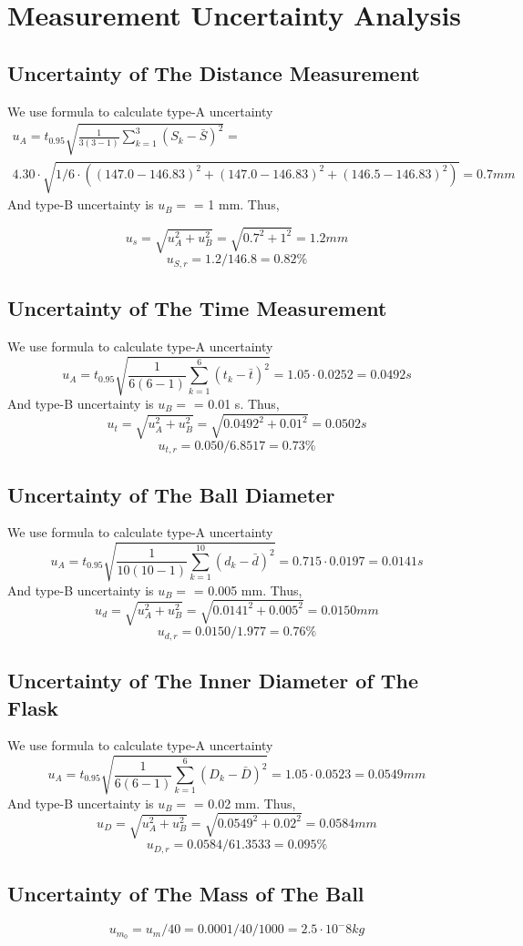 \section{Measurement Uncertainty Analysis}

\subsection{Uncertainty of The Distance Measurement}
We use formula to calculate type-A uncertainty
\begin{multline*}
 u_A = t_{0.95} \sqrt{\frac{1}{3(3-1)} \sum_{k=1}^3{(S_k-\bar{S})^2} } = \\
4.30 \cdot \sqrt{1/6\cdot ( (147.0-  146.83)^2 +  (147.0-  146.83)^2 + (146.5-
  146.83)^2 ) } =   0.7 mm
\end{multline*}
And type-B uncertainty is $u_B = $ = 1 mm. Thus,

$$   u_s = \sqrt{u_A^2+u_B^2} = \sqrt{0.7^2+1^2} = 1.2 mm  $$
$$   u_{S,r} = 1.2 / 146.8 = 0.82 \% $$ 

\subsection{Uncertainty of The Time Measurement}
We use formula to calculate type-A uncertainty
\begin{equation}
 u_A = t_{0.95} \sqrt{\frac{1}{6(6-1)} \sum_{k=1}^6{(t_k-\bar{t})^2} } = 1.05
 \cdot 0.0252 = 0.0492 s
\end{equation}
And type-B uncertainty is $u_B = $ = 0.01 s. Thus,
$$   u_t = \sqrt{u_A^2+u_B^2} = \sqrt{0.0492^2+0.01^2} =  0.0502 s $$
$$   u_{t,r} = 0.050 / 6.8517= 0.73 \% $$ 


\subsection{Uncertainty of The Ball Diameter}
We use formula to calculate type-A uncertainty
\begin{equation}
  u_A = t_{0.95} \sqrt{\frac{1}{10(10-1)} \sum_{k=1}^{10}{(d_k-\bar{d})^2} }
 = 0.715  \cdot   0.0197 = 0.0141 s
\end{equation}
And type-B uncertainty is $u_B = $ = 0.005 mm. Thus,
$$   u_d = \sqrt{u_A^2+u_B^2} = \sqrt{0.0141^2+0.005^2} = 0.0150 mm $$
$$   u_{d,r} = 0.0150 / 1.977 =  0.76 \% $$ 

\subsection{Uncertainty of The Inner Diameter of The Flask}
We use formula to calculate type-A uncertainty
\begin{equation}
  u_A = t_{0.95} \sqrt{\frac{1}{6(6-1)} \sum_{k=1}^{6}{(D_k-\bar{D})^2} }
 = 1.05  \cdot 0.0523 =  0.0549 mm 
\end{equation}
And type-B uncertainty is $u_B = $ = 0.02 mm. Thus,
$$   u_D = \sqrt{u_A^2+u_B^2} = \sqrt{0.0549^2+0.02^2} = 0.0584 mm $$
$$   u_{D,r} = 0.0584 /  61.3533 =  0.095 \% $$ 

\subsection{Uncertainty of The Mass of The Ball}
$$   u_{m_0} = u_m /40 = 0.0001 / 40 / 1000 = 2.5 \cdot 10^-8 kg  $$



